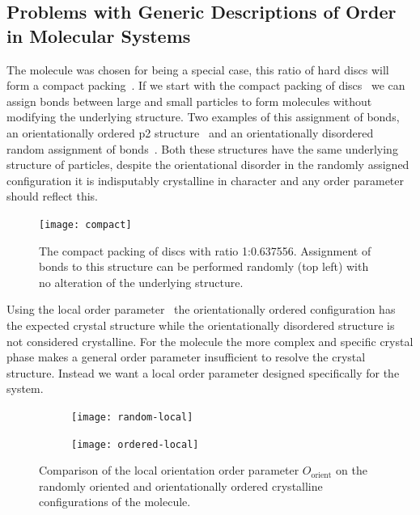 \subsection{Problems with Generic Descriptions of Order in Molecular Systems}

The \dcon molecule was chosen for being a special case, this ratio of hard discs will form a compact packing~. If we start with the compact packing of discs~ we can assign bonds between large and small particles to form \dcon molecules without modifying the underlying structure. Two examples of this assignment of bonds, an orientationally ordered p2 structure~ and an orientationally disordered random assignment of bonds~. Both these structures have the same underlying structure of particles, despite the orientational disorder in the randomly assigned configuration it is indisputably crystalline in character and any order parameter should reflect this.

\begin{figure}
    \centering
    \texttt{[image: compact]}
    \caption{The compact packing of discs with ratio 1:0.637556. Assignment of bonds to this structure can be performed randomly (top left) with no alteration of the underlying structure.}
    \label{fig:compact}
\end{figure}

Using the local order parameter~ the orientationally ordered configuration has the expected crystal structure while the orientationally disordered structure is not considered crystalline. For the \dcon molecule the more complex and specific crystal phase makes a general order parameter insufficient to resolve the crystal structure. Instead we want a local order parameter designed specifically for the \dcon system.

\begin{figure}
    \begin{subfigure}[t]{0.5\linewidth}
        \texttt{[image: random-local]}
        \caption{}
        \label{fig:random local}
    \end{subfigure}
    \begin{subfigure}[t]{0.5\linewidth}
        \texttt{[image: ordered-local]}
        \caption{}
        \label{fig:ordered local}
    \end{subfigure}
    \caption{Comparison of the local orientation order parameter $O_\text{orient}$ on the randomly oriented  and orientationally ordered  crystalline configurations of the \dcon molecule.}
    \label{fig:compact local}
\end{figure}

